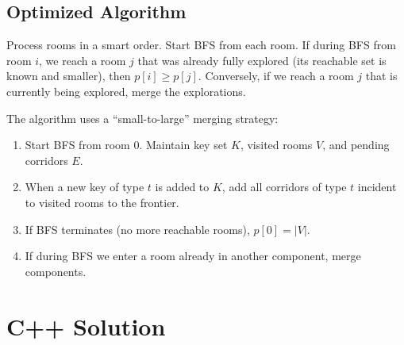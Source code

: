 \documentclass[11pt,a4paper]{article}
\begin{document}
\subsection{Optimized Algorithm}
Process rooms in a smart order. Start BFS from each room. If during BFS from room $i$, we reach a room $j$ that was already fully explored (its reachable set is known and smaller), then $p[i] \ge p[j]$. Conversely, if we reach a room $j$ that is currently being explored, merge the explorations.

The algorithm uses a ``small-to-large'' merging strategy:
\begin{enumerate}
  \item Start BFS from room 0. Maintain key set $K$, visited rooms $V$, and pending corridors $E$.
  \item When a new key of type $t$ is added to $K$, add all corridors of type $t$ incident to visited rooms to the frontier.
  \item If BFS terminates (no more reachable rooms), $p[0] = |V|$.
  \item If during BFS we enter a room already in another component, merge components.
\end{enumerate}

\section{C++ Solution}
\end{document}

